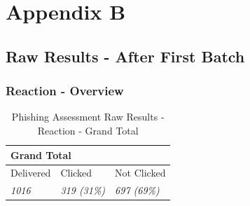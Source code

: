 \documentclass[a4paper]{article}
\begin{document}
\newpage

\section*{Appendix B} \hypertarget{appendix-varreact}{}

\subsection*{Raw Results - After First Batch}

\subsubsection*{Reaction - Overview}

\begingroup
\renewcommand{\arraystretch}{1.25}
\begin{table}[ht]
\begin{center}
    \begin{tabular}{ | m{12.3em} | m{12.3em} | m{12.3em} | }
    \hline
    \multicolumn{3}{|l|}{\textbf{Grand Total}} \\
    \hline
    Delivered & Clicked & Not Clicked \\
    \hline
    \textit{1016} & \textit{319 (31\%)} & \textit{697 (69\%)} \\
    \hline
    \end{tabular}
\end{center}
\caption{Phishing Assessment Raw Results - Reaction - Grand Total}
\label{t-varreact0-grandtotal}
\end{table}

\vspace{10mm}
\end{document}
